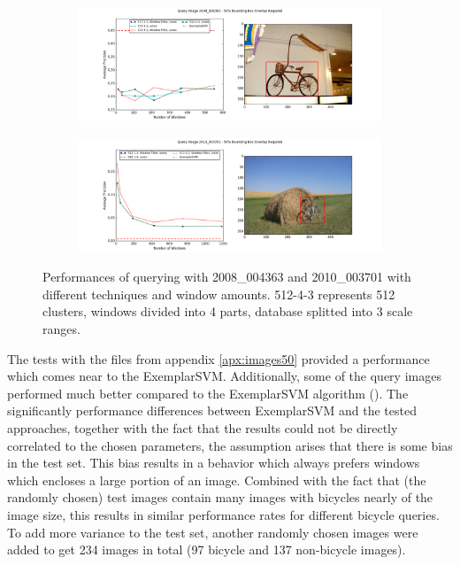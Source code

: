 \begin{figure}
\begin{subfigure}{\textwidth}
\centering
\includegraphics[width=\textwidth]{images/db1_window_comparison-2008_004363}
\end{subfigure}

\begin{subfigure}{\textwidth}
\centering
\includegraphics[width=\textwidth]{images/db1_window_comparison-2010_003701}
\end{subfigure}
\caption[Performances of querying with 2008\_004363 and 2010\_003701 with different techniques and window amounts]{Performances of querying with 2008\_004363 and 2010\_003701 with different techniques and window amounts. 512-4-3 represents 512 clusters, windows divided into 4 parts, database splitted into 3 scale ranges.}
\label{fig:performance_query_params}
\end{figure}


The tests with the files from appendix \ref{apx:images50} provided a performance which comes near to the ExemplarSVM. Additionally, some of the query images performed much better compared to the ExemplarSVM algorithm (). The significantly performance differences between ExemplarSVM and the tested approaches, together with the fact that the results could not be directly correlated to the chosen parameters, the assumption arises that there is some bias in the test set. This bias results in a behavior which always prefers windows which encloses a large portion of an image. Combined with the fact that (the randomly chosen) test images contain many images with bicycles nearly of the image size, this results in similar performance rates for different bicycle queries. To add more variance to the test set, another randomly chosen images were added to get 234 images in total (97 bicycle and 137 non-bicycle images).

